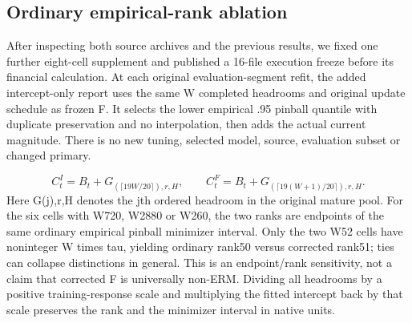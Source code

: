 \documentclass[10pt,a4paper]{article}
\begin{document}
\subsection*{Ordinary empirical-rank ablation}
After inspecting both source archives and the previous results, we fixed one further eight-cell supplement and published a 16-file execution freeze before its financial calculation. At each original evaluation-segment refit, the added intercept-only report uses the same W completed headrooms and original update schedule as frozen F. It selects the lower empirical .95 pinball quantile with duplicate preservation and no interpolation, then adds the actual current magnitude. There is no new tuning, selected model, source, evaluation subset or changed primary.

\[
C^I_t=B_t+G_{(\lceil19W/20\rceil),r,H},\qquad C^F_t=B_t+G_{(\lceil19(W+1)/20\rceil),r,H}.
\]
Here G(j),r,H denotes the jth ordered headroom in the original mature pool. For the six cells with W720, W2880 or W260, the two ranks are endpoints of the same ordinary empirical pinball minimizer interval. Only the two W52 cells have noninteger W times tau, yielding ordinary rank50 versus corrected rank51; ties can collapse distinctions in general. This is an endpoint/rank sensitivity, not a claim that corrected F is universally non-ERM. Dividing all headrooms by a positive training-response scale and multiplying the fitted intercept back by that scale preserves the rank and the minimizer interval in native units.
\end{document}
